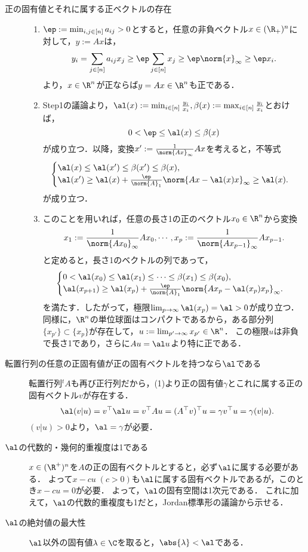 \documentclass[uplatex, dvipdfmx]{jsreport}
\begin{document}
\begin{Proof}\mbox{}
    \begin{description}
        \item[正の固有値とそれに属する正ベクトルの存在] \begin{enumerate}[{Step}1]
            \item $\ep:=\min_{i,j\in[n]} a_{ij}>0$とすると，任意の非負ベクトル$x\in(\R_+)^n$に対して，$y:=Ax$は，
            \[y_i=\sum_{j\in[n]}a_{ij}x_j\ge\ep\sum_{j\in[n]}x_j\ge\ep\norm{x}_\infty\ge\ep x_i.\]
            より，$x\in\R^n$が正ならば$y=Ax\in\R^n$も正である．
            \item Step1の議論より，$\al(x):=\min_{i\in[n]}\frac{y_i}{x_i},\beta(x):=\max_{i\in[n]}\frac{y_i}{x_i}$とおけば，
            \[0<\ep\le\al(x)\le\beta(x)\]
            が成り立つ．以降，変換$x':=\frac{1}{\norm{Ax}_\infty}Ax$を考えると，不等式
            \[\begin{cases}
                \al(x)\le\al(x')\le\beta(x')\le\beta(x),\\
                \al(x')\ge\al(x)+\frac{\ep}{\norm{A}_1}\norm{Ax-\al(x)x}_\infty\ge\al(x).
            \end{cases}\]
            が成り立つ．
            \item このことを用いれば，任意の長さ1の正のベクトル$x_0\in\R^n$から変換
            \[x_1:=\frac{1}{\norm{Ax_0}_\infty}Ax_0,\cdots,x_p:=\frac{1}{\norm{Ax_{p-1}}_\infty}Ax_{p-1}.\]
            と定めると，長さ1のベクトルの列であって，
            \[\begin{cases}
                0<\al(x_0)\le\al(x_1)\le\cdots\le\beta(x_1)\le\beta(x_0),\\
                \al(x_{p+1})\ge\al(x_p)+\frac{\ep}{\norm{A}_1}\norm{Ax_p-\al(x_p)x_p}_\infty.
            \end{cases}\]
            を満たす．したがって，極限$\lim_{p\to\infty}\al(x_p)=\al>0$が成り立つ．
            同様に，$\R^n$の単位球面はコンパクトであるから，ある部分列$\{x_{p'}\}\subset\{x_p\}$が存在して，$u:=\lim_{p'\to\infty}x_{p'}\in\R^n$．
            この極限$u$は非負で長さ1であり，さらに$Au=\al u$より特に正である．
        \end{enumerate}
        \item[転置行列の任意の正固有値が正の固有ベクトルを持つなら$\al$である] 転置行列${}^t\!A$も再び正行列だから，(1)より正の固有値$\gamma$とこれに属する正の固有ベクトル$v$が存在する．
        \[\al(v|u)=v^\top\al u=v^\top Au=(A^\top v)^\top u=\gamma v^\top u=\gamma(v|u).\]
        $(v|u)>0$より，$\al=\gamma$が必要．
        \item[$\al$の代数的・幾何的重複度は1である] $x\in(\R^+)^n$を$A$の正の固有ベクトルとすると，必ず$\al$に属する必要がある．
        よって$x-cu\;(c>0)$も$\al$に属する固有ベクトルであるが，このとき$x-cu=0$が必要．
        よって，$\al$の固有空間は1次元である．
        これに加えて，$\al$の代数的重複度も1だと，Jordan標準形の議論から示せる．
        \item[$\al$の絶対値の最大性] $\al$以外の固有値$\lambda\in\C$を取ると，$\abs{\lambda}<\al$である．
    \end{description}
\end{Proof}
\end{document}

